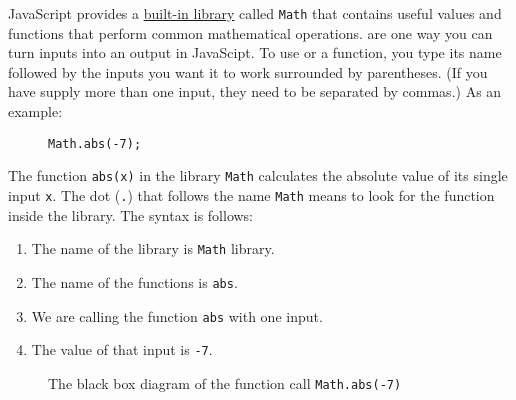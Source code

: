 \documentclass{amsart}
\makeatletter
\def\tikzscale{1}\begin{lrbox}{\measure@tikzpicture}%
\edef\tikzscale{\pgfmathresult}%
\makeatother
\begin{document}
JavaScript provides a \href{https://developer.mozilla.org/en-US/docs/Web/JavaScript/Reference/Global_Objects/Math}{built-in library} called \texttt{Math} that contains useful values and functions that perform common mathematical operations.  are one way you can turn inputs into an output in JavaScipt. To use or  a function, you type its name followed by the inputs you want it to work surrounded by parentheses. (If you have supply more than one input, they need to be separated by commas.) As an example:

\begin{figure}[h]
\begin{lstlisting}
Math.abs(-7);
\end{lstlisting}
\end{figure}

The function \texttt{abs(x)} in the library \texttt{Math} calculates the absolute value of its single input \texttt{x}. The dot (\texttt{.}) that follows the name \texttt{Math} means to look for the function inside the library. The syntax is follows:

\begin{enumerate}
  \item The name of the library is \texttt{Math} library.
  \item The name of the functions is \texttt{abs}.
  \item We are calling the function \texttt{abs} with one input.
  \item The value of that input is \texttt{-7}.
\end{enumerate}

\begin{figure}[h]
\begin{scaletikzpicturetowidth}{\textwidth}
\end{scaletikzpicturetowidth}
\caption{The black box diagram of the function call \texttt{Math.abs(-7)}}
\end{figure}
\end{document}
